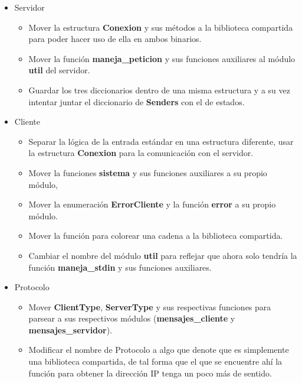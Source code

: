 \documentclass[11pt]{article}
\begin{document}
\begin{itemize}
    \item Servidor
    \begin{itemize}
        \item Mover la estructura \textbf{Conexion} y sus métodos a la biblioteca compartida para poder hacer uso de ella en ambos binarios.
        \item Mover la función \textbf{maneja\_peticion} y sus funciones auxiliares al módulo \textbf{util} del servidor.
        \item Guardar los tres diccionarios dentro de una misma estructura y a su vez intentar juntar el diccionario de \textbf{Senders} con el de estados.
    \end{itemize}
    \item Cliente
    \begin{itemize}
        \item Separar la lógica de la entrada estándar en una estructura diferente, usar la estructura \textbf{Conexion} para la comunicación con el servidor.
        \item Mover la funciones \textbf{sistema} y sus funciones auxiliares a su propio módulo,
        \item Mover la enumeración \textbf{ErrorCliente} y la función \textbf{error} a su propio módulo.
        \item Mover la función para colorear una cadena a la biblioteca compartida.
        \item Cambiar el nombre del módulo \textbf{util} para reflejar que ahora solo tendría la función \textbf{maneja\_stdin} y sus funciones auxiliares.
    \end{itemize}
    \item Protocolo
    \begin{itemize}
        \item Mover \textbf{ClientType}, \textbf{ServerType} y sus respectivas funciones para parsear a sus respectivos módulos (\textbf{mensajes\_cliente} y \textbf{mensajes\_servidor}).
        \item Modificar el nombre de Protocolo a algo que denote que es simplemente una biblioteca compartida, de tal forma que el que se encuentre ahí la función para obtener la dirección IP tenga un poco más de sentido.
    \end{itemize}
\end{itemize}
\end{document}
